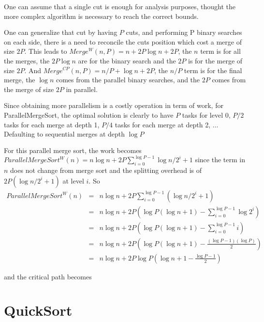 \documentclass{article}
\begin{document}
One can assume that a single cut is enough for analysis purposes,
thought the more complex algorithm is necessary to reach the correct
bounds.

One can generalize that cut by having $P$ cuts, and performing P
binary searches on each side, there is a need to reconcile the cuts
position which cost a merge of size $2P$. This leads to $Merge^W(n,P) =
n + 2 P \log n + 2P$, the $n$ term is for all the merges, the $2P \log
n$ are for the binary search and the $2P$ is for the merge of size
$2P$. And $Merge^{CP}(n,P) = n/P + \log n + 2P$, the $n/P$ term
is for the final merge, the $\log n$ comes from the parallel binary
searches, and the $2P$ comes from the merge of size $2P$ in parallel.

Since obtaining more parallelism is a costly operation in term of
work, for ParallelMergeSort, the optimal solution is clearly to have
$P$ tasks for level 0, $P/2$ tasks for each merge at depth 1,
$P/4$ tasks for each merge at depth 2, ... Defaulting to sequential
merges at depth $\log P$

For this parallel merge sort, the work becomes
$ParallelMergeSort^W(n) = n \log n + 2 P \sum_{i=0}^{\log P - 1} \log n/2^i + 1$
since the term in $n$ does not change
from merge sort and the splitting overhead is of $2P (\log n/2^i + 1)$ at
level $i$. So
\begin{align}
  ParallelMergeSort^W(n) & = & n \log n + 2 P \sum_{i=0}^{\log P - 1}( \log n/2^i + 1  )\\
  & = &n \log n + 2 P \left (\log P (\log n +1)- \sum_{i=0}^{\log P - 1} \log 2^i  \right )  \\
  & = &n \log n + 2 P \left (\log P (\log n +1)- \sum_{i=0}^{\log P - 1} i \right )  \\
  & = &n \log n + 2 P \left ( \log P (\log n +1)- \frac{(\log P - 1)(\log P)}{2}   \right) \\
  & = &n \log n + 2 P \log P \left (  \log n + 1 - \frac{\log P - 1}{2}   \right)  
\end{align}

and the critical path becomes


\section{QuickSort}
\end{document}
